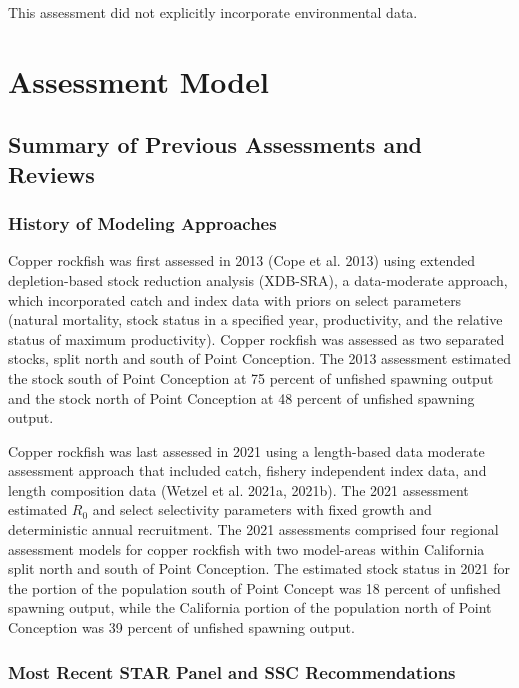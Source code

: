 \documentclass[11pt,
  english,
  letterpaper,
]{article}
\begin{document}
This assessment did not explicitly incorporate environmental data.

\hypertarget{assessment-model}{%
\section{Assessment Model}\label{assessment-model}}

\hypertarget{summary-of-previous-assessments-and-reviews}{%
\subsection{Summary of Previous Assessments and Reviews}\label{summary-of-previous-assessments-and-reviews}}

\hypertarget{history-of-modeling-approaches}{%
\subsubsection{History of Modeling Approaches}\label{history-of-modeling-approaches}}

Copper rockfish was first assessed in 2013 (Cope et al. 2013) using extended depletion-based stock reduction analysis (XDB-SRA), a data-moderate approach, which incorporated catch and index data with priors on select parameters (natural mortality, stock status in a specified year, productivity, and the relative status of maximum productivity). Copper rockfish was assessed as two separated stocks, split north and south of Point Conception. The 2013 assessment estimated the stock south of Point Conception at 75 percent of unfished spawning output and the stock north of Point Conception at 48 percent of unfished spawning output.

Copper rockfish was last assessed in 2021 using a length-based data moderate assessment approach that included catch, fishery independent index data, and length composition data (Wetzel et al. 2021a, 2021b). The 2021 assessment estimated \(R_0\) and select selectivity parameters with fixed growth and deterministic annual recruitment. The 2021 assessments comprised four regional assessment models for copper rockfish with two model-areas within California split north and south of Point Conception. The estimated stock status in 2021 for the portion of the population south of Point Concept was 18 percent of unfished spawning output, while the California portion of the population north of Point Conception was 39 percent of unfished spawning output.

\hypertarget{most-recent-star-panel-and-ssc-recommendations}{%
\subsubsection{Most Recent STAR Panel and SSC Recommendations}\label{most-recent-star-panel-and-ssc-recommendations}}
\end{document}
